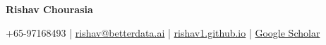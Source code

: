 \documentclass[a4paper,11pt]{article}
\newcommand{\socialicon}[1]{\raisebox{-0.05em}{\resizebox{!}{1em}{#1}}}
\newcommand{\headerfontiii}{\fontfamily{ppl}\selectfont} %
\begin{document}
\headerfontiii

\begin{center}
    {\Huge\textbf{Rishav Chourasia}}
\end{center}
\vspace{-4mm}

\begin{center}
    \small{
    \socialicon{\faPhone} +65-97168493 | 
    \socialicon{\faEnvelope} \href{mailto:rishav@betterdata.ai}{rishav@betterdata.ai} | 
    \socialicon{\faBlog} \href{https://rishav1.github.io/}{\url{rishav1.github.io}}} | 
    \socialicon{\faGraduationCap} \href{https://scholar.google.com.sg/citations?user=UEAtkFYAAAAJ&hl=en}{Google Scholar}
\end{center}
\vspace{-4mm}


\vspace{-4mm}
\end{document}
